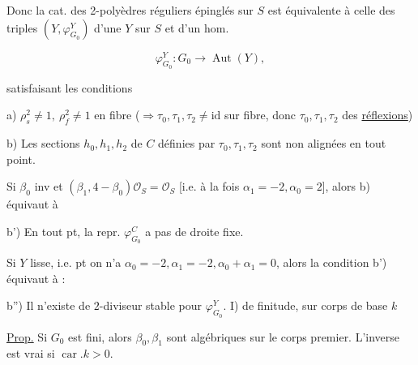 Donc la cat. des 2-polyèdres réguliers  épinglés sur $S$  est équivalente à celle des triples $(Y,\varphi_{G_0}^{Y})$ d'une  $Y$ sur $S$ et d'un hom.


\[
 \varphi_{G_0}^{Y}:G_0\longrightarrow\operatorname{Aut}(Y),
\]

satisfaisant les conditions

a)  $\rho_s^2\ne1,\ \rho_f^2\ne1$ en  fibre ($\Rightarrow\tau_0,\tau_1,\tau_2\ne\mathrm{id}$ sur  fibre, donc $\tau_0,\tau_1,\tau_2$ des \uline{réflexions})


b) Les sections $h_0,h_1,h_2$ de $C$ définies par $\tau_0,\tau_1,\tau_2$ sont non alignées en tout point. 

Si $\beta_0$ inv et $(\beta_1,4-\beta_0)\mathcal O_S=\mathcal O_S$ [i.e.   à la fois  $\alpha_1=-2,\alpha_0=2$], alors b) équivaut à

b') En tout pt, la repr. $\varphi_{G_0}^C$  a pas de droite fixe.

Si $Y$ lisse, i.e.  pt on n'a  $\alpha_0=-2,\alpha_1=-2,\alpha_0+\alpha_1=0$, alors la condition b') équivaut à :

b'')  Il n'existe  de $2$-diviseur stable pour $\varphi_{G_0}^{Y}$.
I)  de finitude, sur corps de base $k$

\uline{Prop.} Si $G_0$ est fini, alors  $\beta_0,\beta_1$ sont algébriques sur le corps premier. L'inverse est vrai si  $\operatorname{car}.k>0$.

